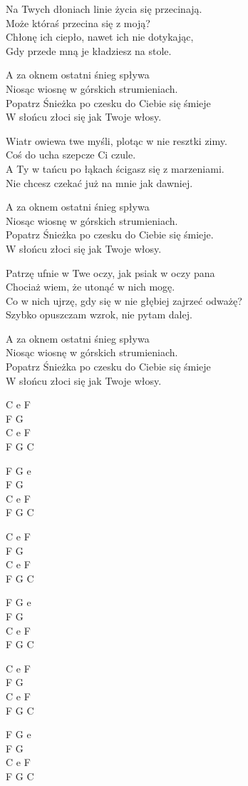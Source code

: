\begin{text}
    Na Twych dłoniach linie życia się przecinają.\\
    Może któraś przecina się z moją?\\
    Chłonę ich ciepło, nawet ich nie dotykając,\\
    Gdy przede mną je kładziesz na stole.

    \vin A za oknem ostatni śnieg spływa\\
    \vin Niosąc wiosnę w górskich strumieniach.\\
    \vin Popatrz Śnieżka po czesku do Ciebie się śmieje\\
    \vin W słońcu złoci się jak Twoje włosy.

    Wiatr owiewa twe myśli, plotąc w nie resztki zimy.\\
    Coś do ucha szepcze Ci czule.\\
    A Ty w tańcu po łąkach ścigasz się z marzeniami.\\
    Nie chcesz czekać już na mnie jak dawniej.

    \vin A za oknem ostatni śnieg spływa\\
    \vin Niosąc wiosnę w górskich strumieniach.\\
    \vin Popatrz Śnieżka po czesku do Ciebie się śmieje.\\
    \vin W słońcu złoci się jak Twoje włosy.

    Patrzę ufnie w Twe oczy, jak psiak w oczy pana\\
    Chociaż wiem, że utonąć w nich mogę.\\
    Co w nich ujrzę, gdy się w nie głębiej zajrzeć odważę? \\
    Szybko opuszczam wzrok, nie pytam dalej.

    \vin A za oknem ostatni śnieg spływa\\
    \vin Niosąc wiosnę w górskich strumieniach.\\
    \vin Popatrz Śnieżka po czesku do Ciebie się śmieje\\
    \vin W słońcu złoci się jak Twoje włosy.
\end{text}
\begin{chord}
    C e F\\
    F G\\
    C e F\\
    F G C

    F G e\\
    F G\\
    C e F\\
    F G C

    C e F\\
    F G\\
    C e F\\
    F G C

    F G e\\
    F G\\
    C e F\\
    F G C

    C e F\\
    F G\\
    C e F\\
    F G C

    F G e\\
    F G\\
    C e F\\
    F G C
\end{chord}
